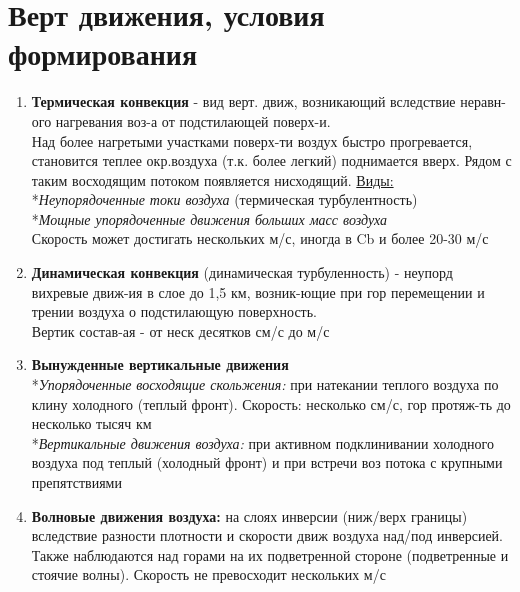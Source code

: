 
\section{Верт движения, условия формирования}
\begin{enumerate}
	\item \textbf{Термическая конвекция} - вид верт. движ, возникающий вследствие неравн-ого нагревания воз-а от подстилающей поверх-и.\\
	Над более нагретыми участками поверх-ти воздух быстро прогревается, становится теплее окр.воздуха (т.к. более легкий) поднимается	вверх. Рядом с таким восходящим потоком появляется нисходящий. \hspace{7ex} \underline{Виды:}\\
	*\textit{Неупорядоченные токи воздуха} (термическая турбулентность)\\
	*\textit{Мощные упорядоченные движения больших масс воздуха}\\
	Скорость может достигать нескольких м/с, иногда в Cb и более 20-30 м/с
	\item \textbf{Динамическая конвекция} (динамическая турбуленность) - неупорд вихревые движ-ия в слое до 1,5 км, возник-ющие при гор перемещении и трении воздуха о подстилающую поверхность.\\
	Вертик состав-ая - от неск десятков см/с до м/с
	\item \textbf{Вынужденные вертикальные движения}\\
	*\textit{Упорядоченные восходящие скольжения:} при натекании теплого воздуха по клину холодного (теплый фронт). Скорость: несколько см/с, гор протяж-ть до несколько тысяч км\\
	*\textit{Вертикальные движения воздуха:} при активном подклинивании холодного воздуха под теплый (холодный фронт) и при встречи воз потока с крупными препятствиями
	\item \textbf{Волновые движения воздуха:} на слоях инверсии (ниж/верх границы) вследствие разности плотности и скорости движ воздуха над/под инверсией. Также наблюдаются над горами на их подветренной стороне (подветренные и стоячие волны). Скорость не превосходит нескольких м/с
\end{enumerate}